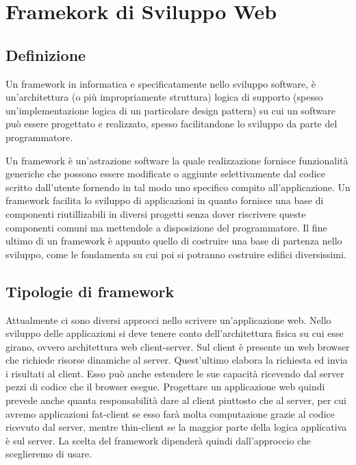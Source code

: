 
\chapter{Framekork di Sviluppo Web}
\setcounter{secnumdepth}{5}
\setcounter{tocdepth}{5}

\section{Definizione}
Un framework in informatica e specificatamente nello sviluppo software, 
è un'architettura (o più impropriamente struttura) logica di supporto
(spesso un'implementazione logica di un particolare design pattern) su 
cui un software può essere progettato e realizzato, spesso facilitandone 
lo sviluppo da parte del programmatore.

Un framework è un'astrazione software la quale realizzazione fornisce funzionalità 
generiche che possono essere modificate o aggiunte selettivamente dal codice scritto 
dall'utente fornendo in tal modo uno specifico compito all'applicazione. Un framework
facilita lo sviluppo di applicazioni in quanto fornisce una base di 
componenti riutillizabili in diversi progetti senza dover riscrivere queste componenti
comuni ma mettendole a disposizione del programmatore.
Il fine ultimo di un framework è appunto quello di costruire una base di partenza nello 
sviluppo, come le fondamenta su cui poi si potranno costruire edifici diversissimi.

\section{Tipologie di framework}
	  Attualmente ci sono diversi approcci nello scrivere un'applicazione web.
	  Nello sviluppo delle applicazioni si deve tenere conto
	  dell'architettura fisica su cui esse girano, ovvero architettura web client-server.
	  Sul client è presente un web browser che richiede risorse dinamiche al server. Quest'ultimo elabora 
	  la richiesta ed invia i risultati al client. Esso può anche estendere le sue capacità ricevendo 
	  dal server pezzi di codice che il browser esegue. Progettare un applicazione web quindi prevede anche 
	  quanta responsabilità dare al client piuttosto che al server, per cui avremo applicazioni fat-client se 
	  esso farà molta computazione grazie al codice ricevuto dal server,
	  mentre thin-client se la maggior parte della logica applicativa è sul server.
	  La scelta del framework dipenderà quindi dall'approccio che sceglieremo di usare.
